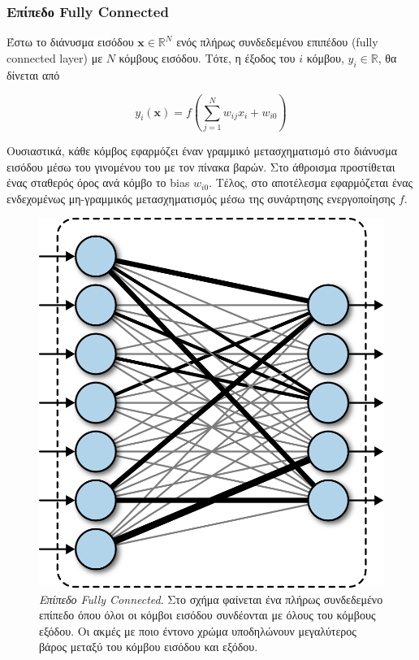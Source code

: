 \subsubsection{Επίπεδο Fully Connected}

	Έστω το διάνυσμα εισόδου $ \pmb{x} \in \mathbb{R}^N $ ενός πλήρως συνδεδεμένου επιπέδου (fully connected layer) με $ N $ κόμβους εισόδου. Τότε, η έξοδος του $i$ κόμβου, $y_i \in \mathbb{R}$, θα δίνεται από
	
	\[ y_i(\pmb{x}) = f(\sum_{j=1}^N w_{ij}x_i + w_{i0} ) \]

	Ουσιαστικά, κάθε κόμβος εφαρμόζει έναν γραμμικό μετασχηματισμό στο διάνυσμα εισόδου μέσω του γινομένου του με τον πίνακα βαρών. Στο άθροισμα προστίθεται ένας σταθερός όρος ανά κόμβο το bias $w_{i0}$. Τέλος, στο αποτέλεσμα εφαρμόζεται ένας ενδεχομένως μη-γραμμικός μετασχηματισμός μέσω της συνάρτησης ενεργοποίησης $f$.

	\begin{figure}[H]
	\centering
	\includegraphics[scale=1]{images/appendix/fully_connected_layer.png}
	\caption[Επίπεδο Fully Connected]{\textsl{Επίπεδο Fully Connected}. Στο σχήμα φαίνεται ένα πλήρως συνδεδεμένο επίπεδο όπου όλοι οι κόμβοι εισόδου συνδέονται με όλους του κόμβους εξόδου. Οι ακμές με ποιο έντονο χρώμα υποδηλώνουν μεγαλύτερος βάρος μεταξύ του κόμβου εισόδου και εξόδου.}
	\label{fig:pooling_example}
\end{figure}

